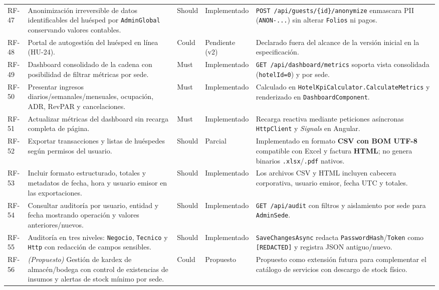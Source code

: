 \documentclass[12pt,a4paper]{article}
\begin{document}
\begin{longtable}{p{1.3cm} p{5.2cm} p{1.3cm} p{2.2cm} p{4.4cm}}
RF-47 & Anonimizaci\'on irreversible de datos identificables del hu\'esped por \texttt{AdminGlobal} conservando valores contables. & Should & Implementado & \texttt{POST /api/guests/\{id\}/anonymize} enmascara PII (\texttt{ANON-...}) sin alterar \texttt{Folios} ni pagos.\\[0.1cm]
RF-48 & Portal de autogesti\'on del hu\'esped en l\'inea (HU-24). & Could & Pendiente (v2) & Declarado fuera del alcance de la versi\'on inicial en la especificaci\'on.\\[0.1cm]
RF-49 & Dashboard consolidado de la cadena con posibilidad de filtrar m\'etricas por sede. & Must & Implementado & \texttt{GET /api/dashboard/metrics} soporta vista consolidada (\texttt{hotelId=0}) y por sede.\\[0.1cm]
RF-50 & Presentar ingresos diarios/semanales/mensuales, ocupaci\'on, ADR, RevPAR y cancelaciones. & Must & Implementado & Calculado en \texttt{HotelKpiCalculator.CalculateMetrics} y renderizado en \texttt{DashboardComponent}.\\[0.1cm]
RF-51 & Actualizar m\'etricas del dashboard sin recarga completa de p\'agina. & Must & Implementado & Recarga reactiva mediante peticiones as\'incronas \texttt{HttpClient} y \textit{Signals} en Angular.\\[0.1cm]
RF-52 & Exportar transacciones y listas de hu\'espedes seg\'un permisos del usuario. & Should & Parcial & Implementado en formato \textbf{CSV con BOM UTF-8} compatible con Excel y factura \textbf{HTML}; no genera binarios \texttt{.xlsx}/\texttt{.pdf} nativos.\\[0.1cm]
RF-53 & Incluir formato estructurado, totales y metadatos de fecha, hora y usuario emisor en las exportaciones. & Should & Implementado & Los archivos CSV y HTML incluyen cabecera corporativa, usuario emisor, fecha UTC y totales.\\[0.1cm]
RF-54 & Consultar auditor\'ia por usuario, entidad y fecha mostrando operaci\'on y valores anteriores/nuevos. & Should & Implementado & \texttt{GET /api/audit} con filtros y aislamiento por sede para \texttt{AdminSede}.\\[0.1cm]
RF-55 & Auditor\'ia en tres niveles: \texttt{Negocio}, \texttt{Tecnico} y \texttt{Http} con redacci\'on de campos sensibles. & Should & Implementado & \texttt{SaveChangesAsync} redacta \texttt{PasswordHash}/\texttt{Token} como \texttt{[REDACTED]} y registra JSON antiguo/nuevo.\\[0.1cm]
RF-56 & \textit{(Propuesto)} Gesti\'on de kardex de almac\'en/bodega con control de existencias de insumos y alertas de stock m\'inimo por sede. & Could & Propuesto & Propuesto como extensi\'on futura para complementar el cat\'alogo de servicios con descargo de stock f\'isico.\\
\end{longtable}
\end{document}
